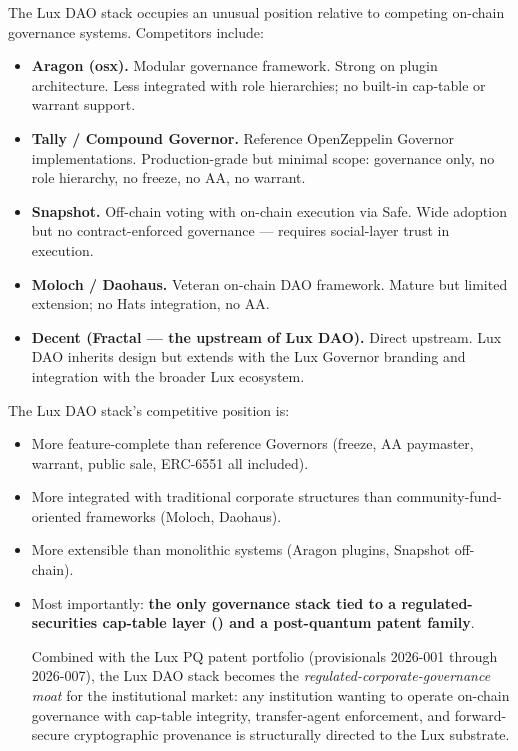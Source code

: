 \documentclass[11pt,letterpaper]{article}
\begin{document}
The Lux DAO stack occupies an unusual position relative to competing on-chain governance systems. Competitors include:

\begin{itemize}
\item \textbf{Aragon (osx).} Modular governance framework. Strong on plugin architecture. Less integrated with role hierarchies; no built-in cap-table or warrant support.
\item \textbf{Tally / Compound Governor.} Reference OpenZeppelin Governor implementations. Production-grade but minimal scope: governance only, no role hierarchy, no freeze, no AA, no warrant.
\item \textbf{Snapshot.} Off-chain voting with on-chain execution via Safe. Wide adoption but no contract-enforced governance --- requires social-layer trust in execution.
\item \textbf{Moloch / Daohaus.} Veteran on-chain DAO framework. Mature but limited extension; no Hats integration, no AA.
\item \textbf{Decent (Fractal --- the upstream of Lux DAO).} Direct upstream. Lux DAO inherits design but extends with the Lux Governor branding and integration with the broader Lux ecosystem.
\end{itemize}

The Lux DAO stack's competitive position is:
\begin{itemize}
\item More feature-complete than reference Governors (freeze, AA paymaster, warrant, public sale, ERC-6551 all included).
\item More integrated with traditional corporate structures than community-fund-oriented frameworks (Moloch, Daohaus).
\item More extensible than monolithic systems (Aragon plugins, Snapshot off-chain).
\item Most importantly: \textbf{the only governance stack tied to a regulated-securities cap-table layer () and a post-quantum patent family}.

Combined with the Lux PQ patent portfolio (provisionals 2026-001 through 2026-007), the Lux DAO stack becomes the \emph{regulated-corporate-governance moat} for the institutional market: any institution wanting to operate on-chain governance with cap-table integrity, transfer-agent enforcement, and forward-secure cryptographic provenance is structurally directed to the Lux substrate.
\end{itemize}
\end{document}
